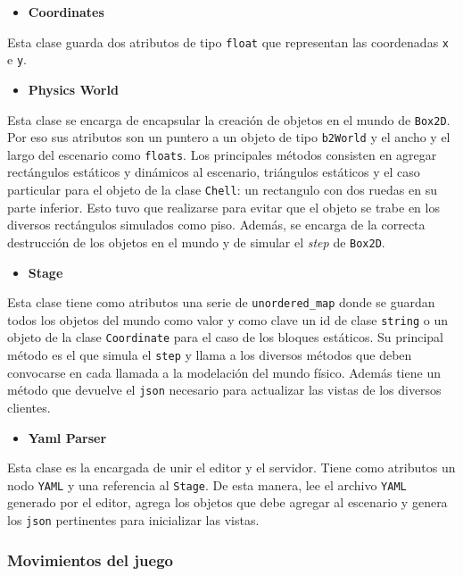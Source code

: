 \documentclass[a4paper]{article}
\begin{document}
\begin{itemize}
	\item \textbf{Coordinates}
\end{itemize}
Esta clase guarda dos atributos de tipo \texttt{float} que representan las coordenadas \texttt{x} e \texttt{y}.

\begin{itemize}
	\item \textbf{Physics World}
\end{itemize}
Esta clase se encarga de encapsular la creación de objetos en el mundo de \texttt{Box2D}. Por eso sus atributos son un puntero a un objeto de tipo \texttt{b2World} y el ancho y el largo del escenario como \texttt{floats}. Los principales métodos consisten en agregar rectángulos estáticos y dinámicos al escenario, triángulos estáticos y el caso particular para el objeto de la clase \texttt{Chell}: un rectangulo con dos ruedas en su parte inferior. Esto tuvo que realizarse para evitar que el objeto se trabe en los diversos rectángulos simulados como piso. Además, se encarga de la correcta destrucción de los objetos en el mundo y de simular el \textit{step} de \texttt{Box2D}.

\begin{itemize}
	\item \textbf{Stage}
\end{itemize}

Esta clase tiene como atributos una serie de \texttt{unordered\_map} donde se guardan todos los objetos del mundo como valor y como clave un id de clase \texttt{string} o un objeto de la clase \texttt{Coordinate} para el caso de los bloques estáticos. Su principal método es el que simula el \texttt{step} y llama a los diversos métodos que deben convocarse en cada llamada a la modelación del mundo físico. Además tiene un método que devuelve el \texttt{json} necesario para actualizar las vistas de los diversos clientes.

\begin{itemize}
	\item \textbf{Yaml Parser}
\end{itemize}
Esta clase es la encargada de unir el editor y el servidor. Tiene como atributos un nodo \texttt{YAML} y una referencia al \texttt{Stage}. De esta manera, lee el archivo \texttt{YAML} generado por el editor, agrega los objetos que debe agregar al escenario y genera los \texttt{json} pertinentes para inicializar las vistas.

\subsubsection{Movimientos del juego}
\end{document}
